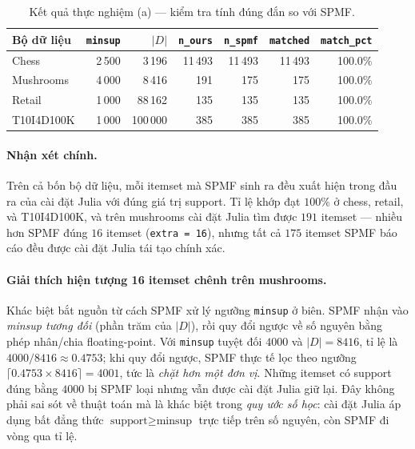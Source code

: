 \begin{table}[htbp]
    \centering
    \caption{Kết quả thực nghiệm (a) --- kiểm tra tính đúng đắn so với SPMF.}
    \label{tab:exp-a}
    \begin{tabular}{l|r|r|r|r|r|r}
        \hline
        \textbf{Bộ dữ liệu} & \texttt{minsup} & $|D|$ & \texttt{n\_ours} & \texttt{n\_spmf} & \texttt{matched} & \texttt{match\_pct} \\ \hline
        Chess       & 2\,500 & 3\,196   & 11\,493 & 11\,493 & 11\,493 & 100.0\% \\
        Mushrooms   & 4\,000 & 8\,416   & 191     & 175     & 175     & 100.0\% \\
        Retail      & 1\,000 & 88\,162  & 135     & 135     & 135     & 100.0\% \\
        T10I4D100K  & 1\,000 & 100\,000 & 385     & 385     & 385     & 100.0\% \\
        \hline
    \end{tabular}
\end{table}

\paragraph{Nhận xét chính.} Trên cả bốn bộ dữ liệu, mỗi itemset mà SPMF sinh ra đều xuất hiện trong đầu ra của cài đặt Julia với đúng giá trị support. Tỉ lệ khớp đạt $100\%$ ở chess, retail, và T10I4D100K, và trên mushrooms cài đặt Julia tìm được $191$ itemset --- nhiều hơn SPMF đúng $16$ itemset (\texttt{extra = 16}), nhưng tất cả $175$ itemset SPMF báo cáo đều được cài đặt Julia tái tạo chính xác.

\paragraph{Giải thích hiện tượng 16 itemset chênh trên mushrooms.} Khác biệt bắt nguồn từ cách SPMF xử lý ngưỡng \texttt{minsup} ở biên. SPMF nhận vào \emph{minsup tương đối} (phần trăm của $|D|$), rồi quy đổi ngược về số nguyên bằng phép nhân/chia floating-point. Với \texttt{minsup} tuyệt đối $4000$ và $|D| = 8416$, tỉ lệ là $4000/8416 \approx 0.4753$; khi quy đổi ngược, SPMF thực tế lọc theo ngưỡng $\lceil 0.4753 \times 8416 \rceil = 4001$, tức là \emph{chặt hơn một đơn vị}. Những itemset có support đúng bằng $4000$ bị SPMF loại nhưng vẫn được cài đặt Julia giữ lại. Đây không phải sai sót về thuật toán mà là khác biệt trong \emph{quy ước số học}: cài đặt Julia áp dụng bất đẳng thức $\text{support} \geq \text{minsup}$ trực tiếp trên số nguyên, còn SPMF đi vòng qua tỉ lệ.

